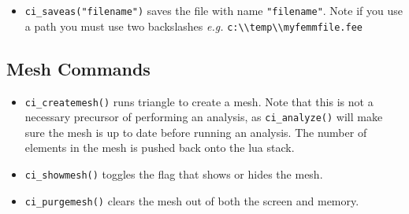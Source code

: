 \begin{itemize}
\item {\tt ci\_saveas("filename")} saves the file with name
\texttt{"filename"}. Note if you use a path you must use two backslashes
{\em e.g.} \verb+c:\\temp\\myfemmfile.fee+

\end{itemize}

\subsection{Mesh Commands}

\begin{itemize}
\item \texttt{ci\_createmesh()} runs triangle to create a mesh. Note that this is not
a necessary precursor of performing an analysis, as
\texttt{ci\_analyze()} will make sure the mesh is up to date before
running an analysis. The number of elements in the mesh is pushed
back onto the lua stack.

\item \texttt{ci\_showmesh()} toggles the flag that shows or hides the mesh.

\item \texttt{ci\_purgemesh()} clears the mesh out of both the screen and memory.
\end{itemize}

